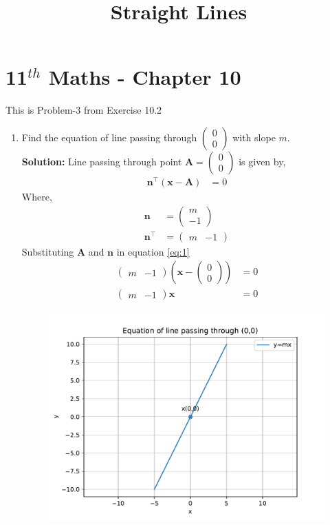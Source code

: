 \documentclass[12pt]{article}
\providecommand{\brak}[1]{\ensuremath{\left(#1\right)}}
\newcommand{\solution}{\noindent \textbf{Solution: }}
\newcommand{\myvec}[1]{\ensuremath{\begin{pmatrix}#1\end{pmatrix}}}
\let\vec\mathbf
\begin{document}
\begin{center}
\title{\textbf{Straight Lines}}
\date{\vspace{-5ex}} %
\maketitle
\end{center}
\setcounter{page}{1}
\section*{11$^{th}$ Maths - Chapter 10}
This is Problem-3 from Exercise 10.2
\begin{enumerate}
	\item Find the equation of line passing through $\myvec{0\\0}$ with slope $m$.\\
\solution
		Line passing through point $\vec{A}=\myvec{0\\0}$ is given by,
\begin{align}
	\vec{n}^\top \brak{\vec{x}-\vec{A}} &= 0\label{eq:1}
\end{align}
Where,
		\begin{align}
			\vec{n} &=\myvec{m \\ -1}\\
			\vec{n}^\top &=\myvec{m & -1}
		\end{align}
		Substituting $\vec{A}$ and $\vec{n}$ in equation \eqref{eq:1}
		\begin{align}
			\myvec{m & -1}\brak{\vec{x}-\myvec{0\\0}} &=0\\
			\myvec{m & -1}\vec{x} &= 0
		\end{align}
\begin{figure}[!h]
\begin{center}
\includegraphics[width=\columnwidth]{figs/fig.pdf}
\end{center}
\caption{}
\label{fig:Fig1}
\end{figure}
\end{enumerate}
\end{document}
